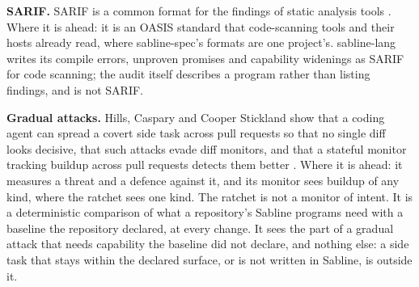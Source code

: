 \documentclass[
]{article}
\begin{document}
\textbf{SARIF.} SARIF is a common format for the findings of static
analysis tools \citep{sarif2020}. Where it is ahead: it is an OASIS
standard that code-scanning tools and their hosts already read, where
sabline-spec's formats are one project's. sabline-lang writes its
compile errors, unproven promises and capability widenings as SARIF for
code scanning; the audit itself describes a program rather than listing
findings, and is not SARIF.

\textbf{Gradual attacks.} Hills, Caspary and Cooper Stickland show that
a coding agent can spread a covert side task across pull requests so
that no single diff looks decisive, that such attacks evade diff
monitors, and that a stateful monitor tracking buildup across pull
requests detects them better \citep{hills2026distributed}. Where it is
ahead: it measures a threat and a defence against it, and its monitor
sees buildup of any kind, where the ratchet sees one kind. The ratchet
is not a monitor of intent. It is a deterministic comparison of what a
repository's Sabline programs need with a baseline the repository
declared, at every change. It sees the part of a gradual attack that
needs capability the baseline did not declare, and nothing else: a side
task that stays within the declared surface, or is not written in
Sabline, is outside it.
\end{document}
